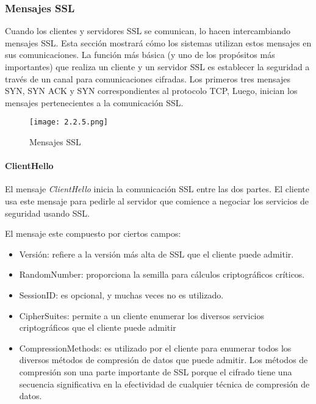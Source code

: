 \subsubsection*{Mensajes SSL}
Cuando los clientes y servidores SSL se comunican, lo hacen 
intercambiando mensajes SSL. Esta sección mostrará cómo los 
sistemas utilizan estos mensajes en sus comunicaciones. La función 
más básica (y uno de los propósitos más importantes) que realiza 
un cliente y un servidor SSL es establecer la seguridad a través
de un canal para comunicaciones cifradas. Los primeros tres mensajes
SYN, SYN ACK y SYN correspondientes al protocolo TCP, Luego, inician los 
mensajes pertenecientes a la comunicación SSL.


\begin{center}
   \begin{figure}   
      \begin{center}
         \texttt{[image: 2.2.5.png]}
      \end{center}
      \caption{Mensajes SSL}
   \end{figure}
\end{center}


\paragraph*{ClientHello}
El mensaje \emph{ClientHello} inicia la comunicación SSL entre las dos partes. 
El cliente usa este mensaje para pedirle al servidor que comience a 
negociar los servicios de seguridad usando SSL.

El mensaje este compuesto por ciertos campos: 
\begin{itemize}
   \setlength\itemsep{-0.6em}
   \item Versión: refiere a la versión más alta de SSL que el cliente 
   puede admitir. 
   \item RandomNumber: proporciona la semilla para cálculos criptográficos
   críticos. 
   \item SessionID: es opcional, y muchas veces no es utilizado. 
   \item CipherSuites: permite a un cliente enumerar los diversos 
   servicios criptográficos que el cliente puede admitir
   \item CompressionMethods: es utilizado por el cliente para enumerar 
   todos los diversos métodos de compresión de datos que puede admitir.
    Los métodos de compresión son una parte importante de SSL porque el 
    cifrado tiene una secuencia significativa en la efectividad de 
    cualquier técnica de compresión de datos. 
\end{itemize}


